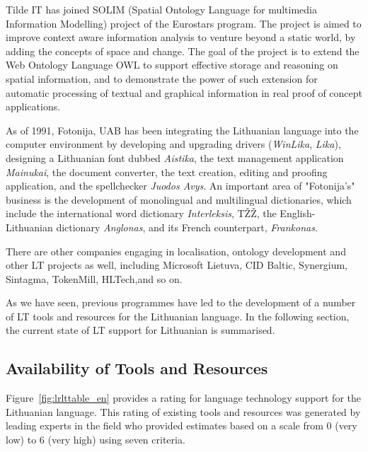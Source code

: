 \begin{multicols}{2}
   Tilde IT has joined SOLIM (Spatial Ontology Language for multimedia Information Modelling) project of the Eurostars program. The project is aimed to improve context aware information analysis to venture beyond a static world, by adding the concepts of space and change. The goal of the project is to extend the Web Ontology Language OWL to support effective storage and reasoning on spatial information, and to demonstrate the power of such extension for automatic processing of textual and graphical information in real proof of concept applications. 

    As of 1991, Fotonija, UAB has been integrating the Lithuanian language into the computer environment by developing and upgrading drivers (\textit{WinLika}, \textit{Lika}), designing a Lithuanian font dubbed \textit{Aistika}, the text management application \textit{Mainukai}, the document converter, the text creation, editing and proofing application, and the spellchecker \textit{Juodos Avys}. An important area of "Fotonija’s" business is the development of monolingual and multilingual dictionaries, which include the international word dictionary \textit{Interleksis}, TŽŽ, the English-Lithuanian dictionary \textit{Anglonas}, and its French counterpart, \textit{Frankonas}.  

There are other companies engaging in localisation, ontology development and other LT projects as well, including Microsoft Lietuva, CID Baltic, Synergium, Sintagma, TokenMill, HLTech,and so on. 

    As we have seen, previous programmes have led to the development of a number of LT tools and resources for the Lithuanian language. In the following section, the current state of LT support for Lithuanian is summarised.
  
\subsection{Availability of Tools and Resources}

Figure~\ref{fig:lrlttable_en} provides a rating for language technology support for the Lithuanian language. This rating of existing tools and resources was generated by leading experts in the field who provided estimates based on a scale from 0 (very low) to 6 (very high) using seven criteria.


\end{multicols}
